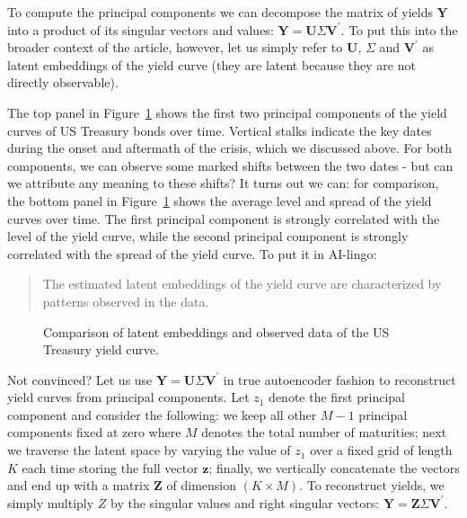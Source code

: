 \documentclass{article}
\theoremstyle{plain}
\theoremstyle{definition}
\theoremstyle{remark}
\begin{document}
To compute the principal components we can decompose the matrix of yields \(\mathbf{Y}\) into a product of its singular vectors and values: \(\mathbf{Y}=\mathbf{U}\Sigma\mathbf{V}^{\prime}\). To put this into the broader context of the article, however, let us simply refer to \(\mathbf{U}\), \(\Sigma\) and \(\mathbf{V}^{\prime}\) as latent embeddings of the yield curve (they are latent because they are not directly observable).

The top panel in Figure~\ref{fig-pca} shows the first two principal
components of the yield curves of US Treasury bonds over time. Vertical
stalks indicate the key dates during the onset and aftermath of the
crisis, which we discussed above. For both components, we can observe
some marked shifts between the two dates - but can we attribute any
meaning to these shifts? It turns out we can: for comparison, the bottom
panel in Figure~\ref{fig-pca} shows the average level and spread of the
yield curves over time. The first principal component is strongly
correlated with the level of the yield curve, while the second principal
component is strongly correlated with the spread of the yield curve. To
put it in AI-lingo:

\begin{quote}
The estimated latent embeddings of the yield curve are characterized by
patterns observed in the data.
\end{quote}

\begin{figure}


\caption{\label{fig-pca}Comparison of latent embeddings and observed
data of the US Treasury yield curve.}

\end{figure}%

Not convinced? Let us use
\(\mathbf{Y}=\mathbf{U}\Sigma\mathbf{V}^{\prime}\) in true autoencoder
fashion to reconstruct yield curves from principal components. Let
\(z_1\) denote the first principal component and consider the following:
we keep all other \(M-1\) principal components fixed at zero where \(M\)
denotes the total number of maturities; next we traverse the latent
space by varying the value of \(z_1\) over a fixed grid of length \(K\)
each time storing the full vector \(\mathbf{z}\); finally, we vertically
concatenate the vectors and end up with a matrix \(\mathbf{Z}\) of
dimension \((K \times M)\). To reconstruct yields, we simply multiply
\(Z\) by the singular values and right singular vectors:
\(\mathbf{Y}=\mathbf{Z}\Sigma\mathbf{V}^{\prime}\).
\end{document}
